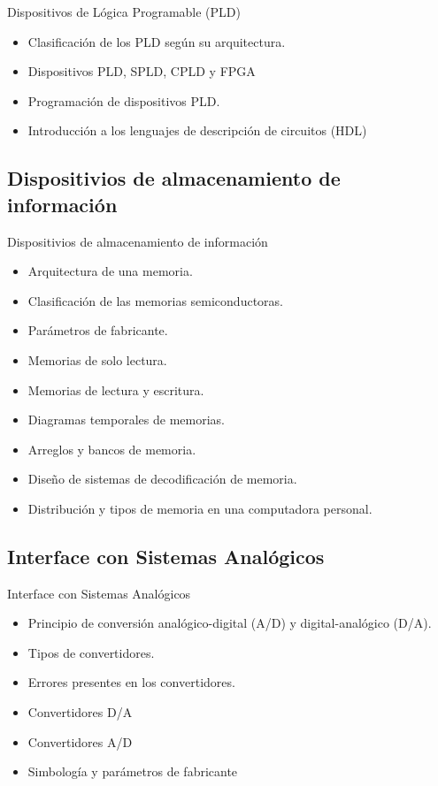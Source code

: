 \documentclass[handout,xcolor=dvipsnames]{beamer}
\begin{document}
\begin{frame}{Dispositivos de Lógica Programable (PLD)}
\begin{block}{}
\begin{itemize}
 \item Clasificación de los PLD según su arquitectura.
 \item Dispositivos PLD, SPLD, CPLD y FPGA
 \item Programación de dispositivos PLD.
 \item Introducción a los lenguajes de descripción de circuitos (HDL)
\end{itemize}
\end{block}
\end{frame}

\subsection[Almacenamiento]{Dispositivios de almacenamiento de información}

\begin{frame}{Dispositivios de almacenamiento de información}
\begin{block}{}
\begin{itemize}
 \item Arquitectura de una memoria.
 \item Clasificación de las memorias semiconductoras.
 \item Parámetros de fabricante.
 \item Memorias de solo lectura.
 \item Memorias de lectura y escritura.
 \item Diagramas temporales de memorias.
 \item Arreglos y bancos de memoria.
 \item Diseño de sistemas de decodificación de memoria.
 \item Distribución y tipos de memoria en una computadora personal.
\end{itemize}
\end{block}
\end{frame}

\subsection[Interface]{Interface con Sistemas Analógicos}

\begin{frame}{Interface con Sistemas Analógicos}
\begin{block}{}
\begin{itemize}
 \item Principio de conversión analógico-digital (A/D) y digital-analógico (D/A).
 \item Tipos de convertidores.
 \item Errores presentes en los convertidores.
 \item Convertidores D/A
 \item Convertidores A/D
 \item Simbología y parámetros de fabricante
\end{itemize}
\end{block}
\end{frame}
\end{document}
